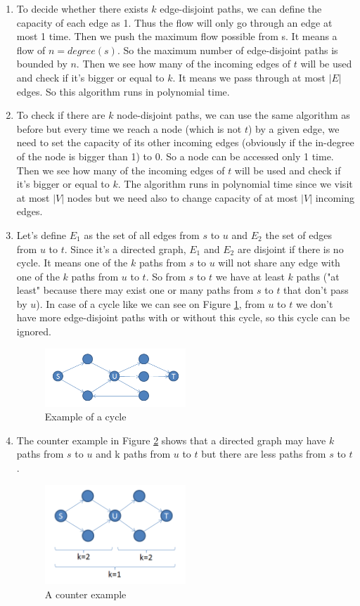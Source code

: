 \begin{enumerate}
	\item To decide whether there exists $k$ edge-disjoint paths, we can define the capacity of each edge as 1. Thus the flow will only go through an edge at most 1 time. Then we push the maximum flow possible from s. It means a flow of $n=degree(s)$. So the maximum number of edge-disjoint paths is bounded by $n$. Then we see how many of the incoming edges of $t$ will be used and check if it's bigger or equal to $k$. It means we pass through at most $|E|$ edges. So this algorithm runs in polynomial time.
	\item To check if there are $k$ node-disjoint paths, we can use the same algorithm as before but every time we reach a node (which is not $t$) by a given edge, we need to set the capacity of its other incoming edges (obviously if the in-degree of the node is bigger than 1) to 0. So a node can be accessed only 1 time. Then we see how many of the incoming edges of $t$ will be used and check if it's bigger or equal to $k$. The algorithm runs in polynomial time since we visit at most $|V|$ nodes but we need also to change capacity of at most $|V|$ incoming edges.
	\item Let's define $E_1$ as the set of all edges from $s$ to $u$ and $E_2$ the set of edges from $u$ to $t$. Since it's a directed graph, $E_1$ and $E_2$ are disjoint if there is no cycle. It means one of the $k$ paths from $s$ to $u$ will not share any edge with one of the $k$ paths from $u$ to $t$. So from $s$ to $t$ we have at least $k$ paths ("at least" because there may exist one or many paths from $s$ to $t$ that don't pass by $u$). In case of a cycle like we can see on Figure \ref{fig:cycle}, from $u$ to $t$ we don't have more edge-disjoint paths with or without this cycle, so this cycle can be ignored.
	\begin{figure}[ht]
  \centering
  \includegraphics[width=0.5\textwidth]{cycle}
  \caption{Example of a cycle}
  \label{fig:cycle}
  \end{figure}
	\item The counter example in Figure \ref{fig:prob1} shows that a directed graph may have $k$ paths from $s$ to $u$ and k paths from $u$ to $t$ but there are less paths from $s$ to $t$.
	\begin{figure}[ht]
  \centering
  \includegraphics[width=0.5\textwidth]{prob1}
  \caption{A counter example}
  \label{fig:prob1}
  \end{figure}
  \clearpage
\end{enumerate}